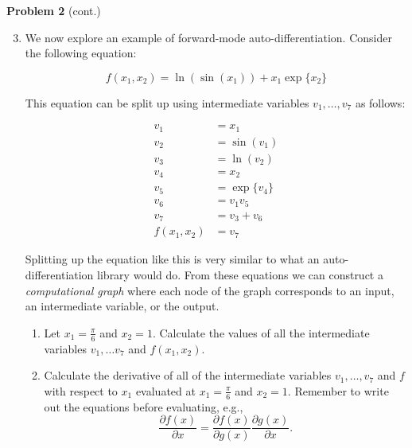 \documentclass[submit]{harvardml}
\begin{document}
\begin{framed}
  \noindent\textbf{Problem 2} (cont.)\\
  \begin{enumerate}
    \setcounter{enumi}{2}

    \item  We now explore an example of forward-mode auto-differentiation. Consider the following
          equation:

          $$
            f(x_1, x_2) = \ln (\sin (x_1)) + x_1 \exp \{ x_2 \}
          $$

          This equation can be split up using intermediate variables $v_1, \dots, v_7$ as follows:

          \begin{align*}
            v_1         & = x_1            \\
            v_2         & = \sin (v_1)     \\
            v_3         & = \ln (v_2)      \\
            v_4         & = x_2            \\
            v_5         & = \exp \{ v_4 \} \\
            v_6         & = v_1v_5         \\
            v_7         & = v_3 + v_6      \\
            f(x_1, x_2) & = v_7
          \end{align*}

          Splitting up the equation like this is very similar to what an auto-differentiation
          library would do. From these equations we can construct a \textit{computational graph}
          where each node of the graph corresponds to an input, an intermediate variable, or
          the output.

          \begin{enumerate}
            \item Let $x_1 = \frac{\pi}{6}$ and $x_2 = 1$. Calculate the values of all the
                  intermediate variables $v_1, \dots v_7$ and $f(x_1,x_2)$.
            \item Calculate the derivative of
                  all of the intermediate variables $v_1, \dots, v_7$ and
                  $f$ with respect to $x_1$ evaluated
                  at $x_1 = \frac{\pi}{6}$ and $x_2 = 1$. Remember to write out the equations before evaluating, e.g.,
                  \[
                    \frac{\partial f(x)}{\partial x} = \frac{\partial f(x)}{\partial g(x)} \frac{\partial g(x)}{\partial x}.
                  \]
          \end{enumerate}
  \end{enumerate}
\end{framed}
\end{document}
